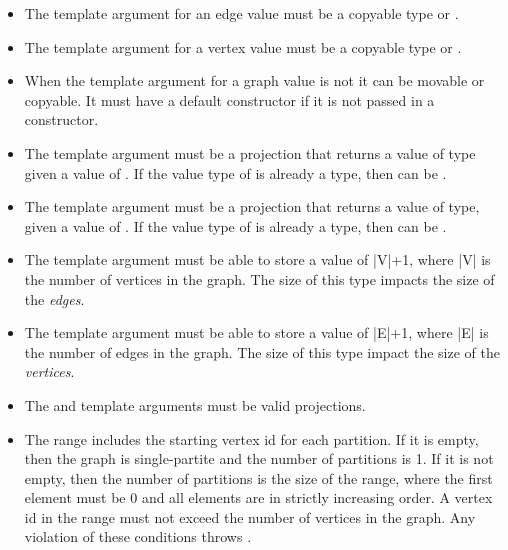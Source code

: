 \begin{itemdescr}
    \pnum\mandates
        \begin{itemize}
            \item The  template argument for an edge value must be a copyable type or .
            \item The  template argument for a vertex value must be a copyable type or .
            \item When the  template argument for a graph value is not  it can be movable or copyable. It must have a 
                  default constructor if it is not passed in a  constructor.
            \item The  template argument must be a projection that returns a value of  type
                  given a value of . If the value type of  is already a  type, 
                  then  can be .
            \item The  template argument must be a projection that returns a value of  type,
                  given a value of . If the value type of  is already a  type, 
                  then  can be .
        \end{itemize}
    \pnum\preconditions
        \begin{itemize}
            \item The  template argument must be able to store a value of |V|+1, where |V| is the
                  number of vertices in the graph. The size of this type impacts the size of the \textit{edges}.
            \item The  template argument must be able to store a value of |E|+1, where |E| is the
                  number of edges in the graph. The size of this type impact the size of the \textit{vertices}.
            \item The  and  template arguments must be valid projections.
            \item The  range includes the starting vertex id for each partition. If it is empty, then the graph is single-partite
                    and the number of partitions is 1. If it is not empty, then the number of partitions is the size of the range, where the first element
                    must be 0 and all elements are in strictly increasing order. A vertex id in the range must not exceed the number of 
                    vertices in the graph. Any violation of these conditions throws .
        \end{itemize}


\end{itemdescr}
